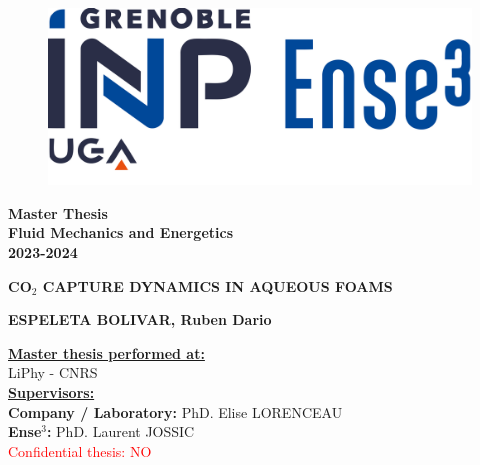 \thispagestyle{empty}
\begin{center}
    	\begin{figure} [t]
    	\centering
		\includegraphics[width=0.5\linewidth]{../fig/GrenobleINP_ense3_logo.png}
	    \end{figure}
    	\vspace{1.5cm}

        \begin{Large}
        
        \textbf{Master Thesis} \\
        \vspace{0.5cm}
        \textbf{Fluid Mechanics and Energetics} \\
        \vspace{0.5cm}
        \textbf{2023-2024}\\
        \end{Large}
        \vspace{1.5cm}
        \begin{large}
        	\textbf{CO$_2$ CAPTURE DYNAMICS IN AQUEOUS FOAMS}\\
        \end{large}
        \vspace{1.5cm}
        \textbf{ESPELETA BOLIVAR, Ruben Dario}\\
        \vspace{3.0cm}
        
\end{center}

\begin{flushleft}
	\textbf{\underline{Master thesis performed at:}}\\
	\vspace{0.5cm}
	LiPhy - CNRS \\
	\vspace{1cm}
	\textbf{\underline{Supervisors:}} \\
	\vspace{0.5cm}
	\textbf{Company / Laboratory:} PhD. Elise LORENCEAU \\
	\textbf{Ense$^3$:} PhD. Laurent JOSSIC \\
	\vspace{3cm}
	\textcolor{red}{Confidential thesis:} \textcolor{red}{NO}
\end{flushleft}


\clearpage

